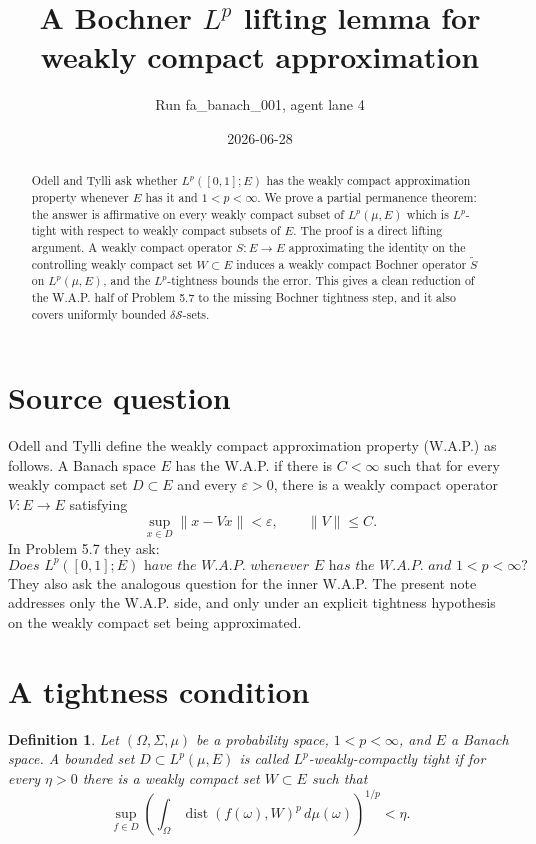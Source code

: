 \documentclass[11pt]{article}
\title{A Bochner \(L^p\) lifting lemma for weakly compact approximation}
\author{Run fa\_banach\_001, agent lane 4}
\date{2026-06-28}
\newtheorem{definition}{Definition}
\newcommand{\dist}{\operatorname{dist}}
\newcommand{\eps}{\varepsilon}
\begin{document}
\maketitle

\begin{abstract}
Odell and Tylli ask whether \(L^p([0,1];E)\) has the weakly compact approximation property whenever \(E\) has it and \(1<p<\infty\).  We prove a partial permanence theorem: the answer is affirmative on every weakly compact subset of \(L^p(\mu,E)\) which is \(L^p\)-tight with respect to weakly compact subsets of \(E\).  The proof is a direct lifting argument.  A weakly compact operator \(S:E\to E\) approximating the identity on the controlling weakly compact set \(W\subset E\) induces a weakly compact Bochner operator \(\widetilde S\) on \(L^p(\mu,E)\), and the \(L^p\)-tightness bounds the error.  This gives a clean reduction of the W.A.P. half of Problem 5.7 to the missing Bochner tightness step, and it also covers uniformly bounded \(\delta\mathcal S\)-sets.
\end{abstract}

\section{Source question}

Odell and Tylli define the weakly compact approximation property (W.A.P.) as follows.  A Banach space \(E\) has the W.A.P. if there is \(C<\infty\) such that for every weakly compact set \(D\subset E\) and every \(\eps>0\), there is a weakly compact operator \(V:E\to E\) satisfying
\[
  \sup_{x\in D}\|x-Vx\|<\eps,\qquad \|V\|\le C.
\]
In Problem 5.7 they ask:
\[
\textit{Does }L^p([0,1];E)\textit{ have the W.A.P. whenever }E\textit{ has the W.A.P. and }1<p<\infty?
\]
They also ask the analogous question for the inner W.A.P.  The present note addresses only the W.A.P. side, and only under an explicit tightness hypothesis on the weakly compact set being approximated.

\section{A tightness condition}

\begin{definition}
Let \((\Omega,\Sigma,\mu)\) be a probability space, \(1<p<\infty\), and \(E\) a Banach space.  A bounded set \(D\subset L^p(\mu,E)\) is called \(L^p\)-weakly-compactly tight if for every \(\eta>0\) there is a weakly compact set \(W\subset E\) such that
\[
  \sup_{f\in D}\left(\int_\Omega \dist(f(\omega),W)^p\,d\mu(\omega)\right)^{1/p}<\eta .
\]
\end{definition}
\end{document}
